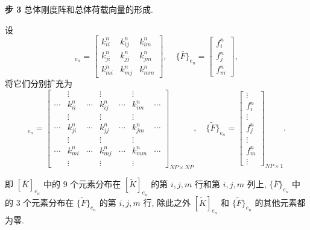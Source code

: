 \textbf{步 3} 总体刚度阵和总体荷载向量的形成.\par
设
\begin{equation*}
[\overline{K}]_{e_n} = \begin{bmatrix} k_{ii}^n & k_{ij}^n & k_{im}^n \\ k_{ji}^n & k_{jj}^n &
k_{jm}^n \\ k_{mi}^n & k_{mj}^n & k_{mm}^n \end{bmatrix}, \quad \{\overline{F}\}_{e_n} =
\begin{bmatrix} f_i^n \\ f_j^n \\ f_m^n \end{bmatrix},
\end{equation*}
将它们分别扩充为
\begin{equation*}
[\widetilde{K}]_{e_n} = \begin{bmatrix}
& \vdots & & \vdots & & \vdots & \\
\cdots & k_{ii}^n & \cdots & k_{ij}^n & \cdots & k_{im}^n & \cdots \\
& \vdots & & \vdots & & \vdots & \\
\cdots & k_{ji}^n & \cdots & k_{jj}^n & \cdots & k_{jm}^n & \cdots \\
& \vdots & & \vdots & & \vdots & \\
\cdots & k_{mi}^n & \cdots & k_{mj}^n & \cdots & k_{mm}^n & \cdots \\
& \vdots & & \vdots & & \vdots &
\end{bmatrix}_{NP \times NP}, \quad
\{\widetilde{F}\}_{e_n} = \begin{bmatrix}
\vdots \\
f_i^n \\
\vdots \\
f_j^n \\
\vdots \\
f_m^n \\
\vdots
\end{bmatrix}_{NP \times 1}.
\end{equation*}

即 $[\overline{K}]_{e_n}$ 中的 $9$ 个元素分布在 $[\widetilde{K}]_{e_n}$ 的第 $i,j,m$ 行和第
$i,j,m$ 列上, $\{\overline{F}\}_{e_n}$ 中的 $3$ 个元素分布在 $\{\widetilde{F}\}_{e_n}$ 的第
$i,j,m$ 行, 除此之外 $[\widetilde{K}]_{e_n}$ 和 $\{\widetilde{F}\}_{e_n}$ 的其他元素都为零.

